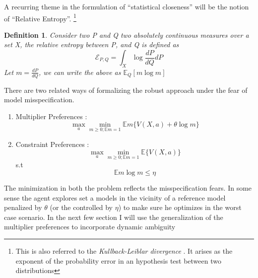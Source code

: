 \documentclass[12pt]{article}
\newtheorem{definition}{Definition}
\begin{document}
\noindent A recurring theme in the formulation of ``statistical closeness'' will be the notion of ``Relative Entropy''. \footnote{This is also referred to the \emph{Kullback-Leiblar divergence} . It arises as the exponent of the probability error in an hypothesis test between two distributions}
\begin{definition}
Consider two P and Q two absolutely continuous measures over a set X, the relative entropy between P, and Q is defined as 
\[\mathcal{E}_{P,Q} = \int_{X}\log\frac{{dP}}{dQ}dP\]
Let $m=\frac{{dP}}{dQ}$, we can write the above as $\mathbb{E}_Q [m \log m]$
\end{definition}

There are two related ways of formalizing the robust approach under the fear of model misspecification. 
\begin{enumerate}
	\item Multiplier Preferences : \[\max_{a}\min_{m\geq 0; \mathbb{E}m=1} \mathbb{E}m\{V(X,a) + \theta \log m \}\]
	\item Constraint Preferences : \[\max_{a}\min_{m\geq 0; \mathbb{E}m=1} \mathbb{E}\{V(X,a) \}\]
	s.t 
	\[\mathbb{E}m\log m \leq \eta\]
	
\end{enumerate}
The minimization in both the problem reflects the misspecification fears. In some sense the agent explores set a models in the vicinity of a reference model penalized by $\theta$ (or the controlled by $\eta$) to make sure he optimizes in the worst case scenario. In the next few section I will use the generalization of the multiplier preferences to incorporate dynamic ambiguity
\end{document}
